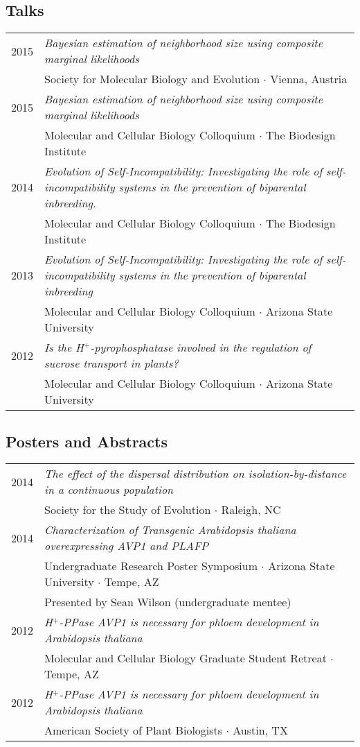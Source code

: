 \documentclass[11pt]{article}
\begin{document}
\subsection*{Talks}
\renewcommand{\arraystretch}{1}
\begin{tabularx}{\linewidth}{l X}
2015&\textit{Bayesian estimation of neighborhood size using composite marginal likelihoods}\\
&Society for Molecular Biology and Evolution $\cdotp$ Vienna, Austria\\
2015&\textit{Bayesian estimation of neighborhood size using composite marginal likelihoods}\\
&Molecular and Cellular Biology Colloquium $\cdot$ The Biodesign Institute\\
2014&\textit{Evolution of Self-Incompatibility: Investigating the role of self-incompatibility systems in the prevention of biparental inbreeding.}\\
&Molecular and Cellular Biology Colloquium $\cdotp$ The Biodesign Institute\\
2013&\textit{Evolution of Self-Incompatibility: Investigating the role of self-incompatibility systems in the prevention of biparental inbreeding}\\
&Molecular and Cellular Biology Colloquium $\cdotp$ Arizona State University\\
2012&\textit{Is the H$^+$-pyrophosphatase involved in the regulation of sucrose transport in plants?}\\
&Molecular and Cellular Biology Colloquium $\cdotp$ Arizona State University\\
\end{tabularx}
\subsection*{Posters and Abstracts}
\begin{tabularx}{\linewidth}{l X}
2014&\textit{The effect of the dispersal distribution on isolation-by-distance in a continuous population}\\
&Society for the Study of Evolution $\cdotp$ Raleigh, NC\\
2014&\textit{Characterization of Transgenic Arabidopsis thaliana overexpressing AVP1 and PLAFP}\\
&Undergraduate Research Poster Symposium $\cdotp$ Arizona State University $\cdotp$ Tempe, AZ\\
&Presented by Sean Wilson (undergraduate mentee)\\
2012&\textit{H$^+$-PPase AVP1 is necessary for phloem development in Arabidopsis thaliana}\\
&Molecular and Cellular Biology Graduate Student Retreat $\cdotp$ Tempe, AZ\\
2012&\textit{H$^+$-PPase AVP1 is necessary for phloem development in Arabidopsis thaliana}\\
&American Society of Plant Biologists $\cdotp$ Austin, TX\\
\end{tabularx}
\end{document}
